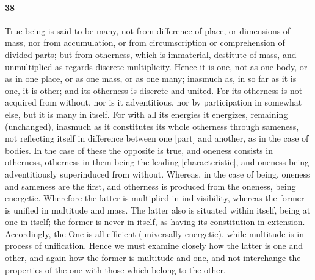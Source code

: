 \documentclass[12pt]{article}
\begin{document}
\paragraph{38} True being is said to be many, not from difference of place, or
dimensions of mass, nor from accumulation, or from circumscription or
comprehension of divided parts; but from otherness, which is immaterial,
destitute of mass, and unmultiplied as regards discrete multiplicity. Hence it
is one, not as one body, or as in one place, or as one mass, or as one many;
inasmuch as, in so far as it is one, it is other; and its otherness is discrete
and united. For its otherness is not acquired from without, nor is it
adventitious, nor by participation in somewhat else, but it is many in itself.
For with all its energies it energizes, remaining (unchanged), inasmuch as it
constitutes its whole otherness through sameness, not reflecting itself in
difference between one [part] and another, as in the case of bodies. In the
case of these the opposite is true, and oneness consists in otherness,
otherness in them being the leading [characteristic], and oneness being
adventitiously superinduced from without. Whereas, in the case of being,
oneness and sameness are the first, and otherness is produced from the oneness,
being energetic. Wherefore the latter is multiplied in indivisibility, whereas
the former is unified in multitude and mass. The latter also is situated within
itself, being at one in itself; the former is never in itself, as having its
constitution in extension. Accordingly, the One is all-efficient
(universally-energetic), while multitude is in process of unification. Hence we
must examine closely how the latter is one and other, and again how the former
is multitude and one, and not interchange the properties of the one with those
which belong to the other.
\end{document}
